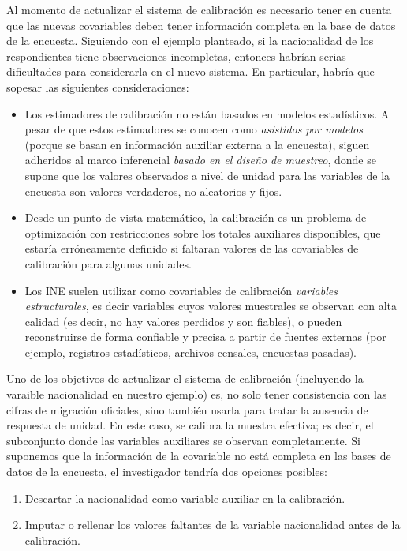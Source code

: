 \documentclass[
  12pt,
]{book}
\providecommand{\tightlist}{%
  \setlength{\itemsep}{0pt}\setlength{\parskip}{0pt}}
\begin{document}
Al momento de actualizar el sistema de calibración es necesario tener en cuenta que las nuevas covariables deben tener información completa en la base de datos de la encuesta. Siguiendo con el ejemplo planteado, si la nacionalidad de los respondientes tiene observaciones incompletas, entonces habrían serias dificultades para considerarla en el nuevo sistema. En particular, habría que sopesar las siguientes consideraciones:

\begin{itemize}
\item
  Los estimadores de calibración no están basados en modelos estadísticos. A pesar de que estos estimadores se conocen como \emph{asistidos por modelos} (porque se basan en información auxiliar externa a la encuesta), siguen adheridos al marco inferencial \emph{basado en el diseño de muestreo}, donde se supone que los valores observados a nivel de unidad para las variables de la encuesta son valores verdaderos, no aleatorios y fijos.
\item
  Desde un punto de vista matemático, la calibración es un problema de optimización con restricciones sobre los totales auxiliares disponibles, que estaría erróneamente definido si faltaran valores de las covariables de calibración para algunas unidades.
\item
  Los INE suelen utilizar como covariables de calibración \emph{variables estructurales}, es decir variables cuyos valores muestrales se observan con alta calidad (es decir, no hay valores perdidos y son fiables), o pueden reconstruirse de forma confiable y precisa a partir de fuentes externas (por ejemplo, registros estadísticos, archivos censales, encuestas pasadas).
\end{itemize}

Uno de los objetivos de actualizar el sistema de calibración (incluyendo la varaible nacionalidad en nuestro ejemplo) es, no solo tener consistencia con las cifras de migración oficiales, sino también usarla para tratar la ausencia de respuesta de unidad. En este caso, se calibra la muestra efectiva; es decir, el subconjunto donde las variables auxiliares se observan completamente. Si suponemos que la información de la covariable no está completa en las bases de datos de la encuesta, el investigador tendría dos opciones posibles:

\begin{enumerate}
\def\labelenumi{\arabic{enumi}.}
\tightlist
\item
  Descartar la nacionalidad como variable auxiliar en la calibración.
\item
  Imputar o rellenar los valores faltantes de la variable nacionalidad antes de la calibración.
\end{enumerate}
\end{document}
